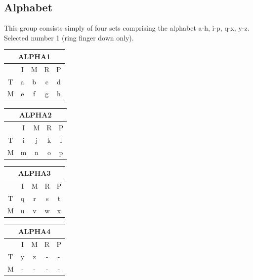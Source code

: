 \documentclass{article}
\begin{document}
\subsection{Alphabet}
This group consists simply of four sets comprising the alphabet a-h, i-p, q-x, y-z. Selected number 1 (ring finger down only).
\begin{center}
	\begin{table}[!h]
		\begin{subtable}{0.45\textwidth}
			\centering
			\begin{tabular}{|c|c|c|c|c|}
				\hline
				\multicolumn{5}{|c|}{ALPHA1}\\ \hline
				  & I & M & R & P \\ \hline
				T & a & b & c & d \\ \hline
				M & e & f & g & h \\ \hline
			\end{tabular}
		\end{subtable}
		\begin{subtable}{0.45\textwidth}
			\centering
			\begin{tabular}{|c|c|c|c|c|}
				\hline
				\multicolumn{5}{|c|}{ALPHA2}\\ \hline
				& I & M & R & P \\ \hline
				T & i & j & k & l \\ \hline
				M & m & n & o & p \\ \hline
			\end{tabular}
		\end{subtable}
	\end{table}
\end{center}

\begin{center}
	\begin{table}[!h]
		\begin{subtable}{0.45\textwidth}
			\centering
			\begin{tabular}{|c|c|c|c|c|}
				\hline
				\multicolumn{5}{|c|}{ALPHA3}\\ \hline
				& I & M & R & P \\ \hline
				T & q & r & s & t \\ \hline
				M & u & v & w & x \\ \hline
			\end{tabular}
		\end{subtable}
		\begin{subtable}{0.45\textwidth}
			\centering
			\begin{tabular}{|c|c|c|c|c|}
				\hline
				\multicolumn{5}{|c|}{ALPHA4}\\ \hline
				& I & M & R & P \\ \hline
				T & y & z & - & - \\ \hline
				M & - & - & - & - \\ \hline
			\end{tabular}
		\end{subtable}
	\end{table}
\end{center}
\end{document}
